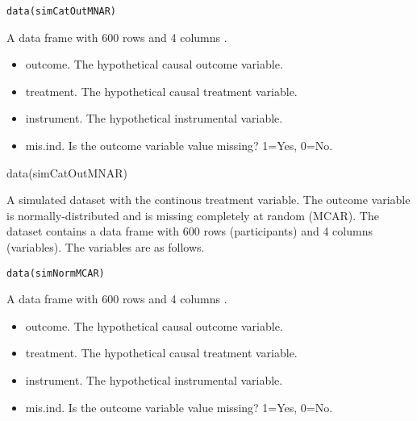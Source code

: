 \documentclass[a4paper]{book}
\begin{document}
%
\begin{Usage}
\begin{verbatim}
data(simCatOutMNAR)
\end{verbatim}
\end{Usage}
%
\begin{Format}
A data frame with 600 rows and 4 columns .
\end{Format}
%
\begin{Details}\relax
\begin{itemize}

\item outcome. The hypothetical causal outcome variable.
\item treatment. The hypothetical causal treatment variable.
\item instrument. The hypothetical instrumental variable.
\item mis.ind. Is the outcome variable value missing? 1=Yes, 0=No.

\end{itemize}

\end{Details}
%
\begin{Examples}
\begin{ExampleCode}

data(simCatOutMNAR)


\end{ExampleCode}
\end{Examples}
%
\begin{Description}\relax
A simulated dataset with the continous treatment variable. The outcome variable is
normally-distributed and is missing completely at random (MCAR).
The dataset contains a data frame with 600 rows (participants) and 4 columns (variables).
The variables are as follows.
\end{Description}
%
\begin{Usage}
\begin{verbatim}
data(simNormMCAR)
\end{verbatim}
\end{Usage}
%
\begin{Format}
A data frame with 600 rows and 4 columns .
\end{Format}
%
\begin{Details}\relax
\begin{itemize}

\item outcome. The hypothetical causal outcome variable.
\item treatment. The hypothetical causal treatment variable.
\item instrument. The hypothetical instrumental variable.
\item mis.ind. Is the outcome variable value missing? 1=Yes, 0=No.

\end{itemize}

\end{Details}
\end{document}
